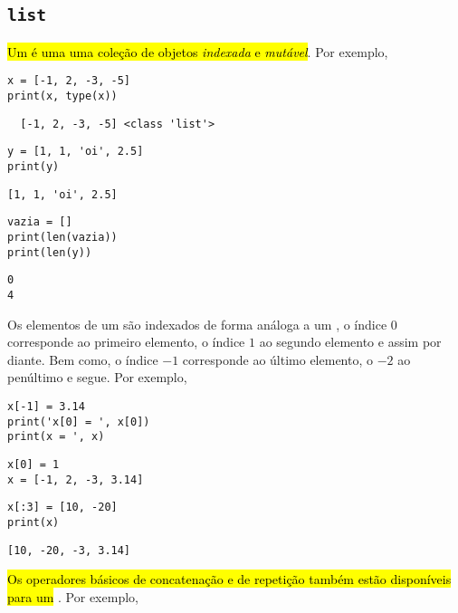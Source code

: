\documentclass[a4paper,10pt,twoside]{article}
\begin{document}
\subsection{\texttt{list}}

\hl{Um {\PYTHONlist} é uma uma coleção de objetos \emph{indexada} e \emph{mutável}}. Por exemplo,

\begin{lstlisting}
x = [-1, 2, -3, -5]
print(x, type(x))
\end{lstlisting}

\begin{verbatim}
  [-1, 2, -3, -5] <class 'list'>
\end{verbatim}

\begin{lstlisting}
y = [1, 1, 'oi', 2.5]
print(y)
\end{lstlisting}

\begin{verbatim}
[1, 1, 'oi', 2.5]
\end{verbatim}

\begin{lstlisting}
vazia = []
print(len(vazia))
print(len(y))
\end{lstlisting}

\begin{verbatim}
0
4
\end{verbatim}

Os elementos de um {\PYTHONlist} são indexados de forma análoga a um {\PYTHONtuple}, o índice $0$ corresponde ao primeiro elemento, o índice $1$ ao segundo elemento e assim por diante. Bem como, o índice $-1$ corresponde ao último elemento, o $-2$ ao penúltimo e segue. Por exemplo,

\begin{lstlisting}
x[-1] = 3.14
print('x[0] = ', x[0])
print(x = ', x)
\end{lstlisting}

\begin{verbatim}
x[0] = 1
x = [-1, 2, -3, 3.14]
\end{verbatim}

\begin{lstlisting}
x[:3] = [10, -20]
print(x)
\end{lstlisting}

\begin{verbatim}
[10, -20, -3, 3.14]
\end{verbatim}

\hl{Os operadores básicos de concatenação e de repetição também estão disponíveis para um {\PYTHONlist}}. Por exemplo,
\end{document}
